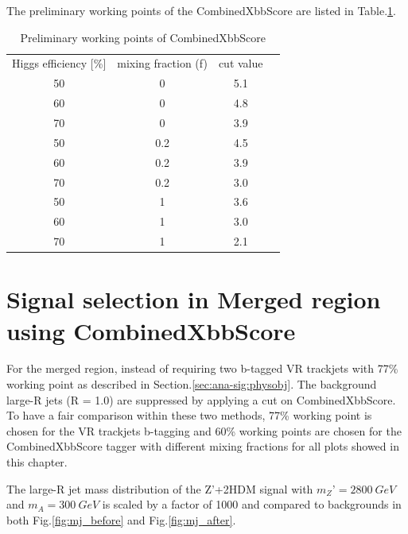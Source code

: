 \par The preliminary working points of the CombinedXbbScore are listed in Table.\ref{tab:combxbb}.

\begin{table}
    \footnotesize{
        \begin{center}
            \begin{tabular}{ c |c |c |c}
                \hline
                \hline
                Higgs efficiency [\%] & mixing fraction (f)	& cut value \\
                50 & 0 & 5.1 \\
                60 & 0 & 4.8 \\
                70 & 0 & 3.9 \\
                50 & 0.2 & 4.5 \\
                60 & 0.2 & 3.9 \\
                70 & 0.2 & 3.0 \\
                50 & 1 & 3.6 \\
                60 & 1 & 3.0 \\
                70 & 1 & 2.1 \\
                \hline
                \hline
            \end{tabular}
        \end{center}
        }
    \caption{Preliminary working points of CombinedXbbScore}
    \label{tab:combxbb}
\end{table}

\section{Signal selection in Merged region using CombinedXbbScore}

\par For the merged region, instead of requiring two b-tagged VR trackjets with 77\% working point as described in Section.\ref{sec:ana-sig:physobj}. 
The background large-R jets (R = 1.0) are suppressed by applying a cut on CombinedXbbScore. 
To have a fair comparison within these two methods, 77\% working point is chosen for the VR trackjets b-tagging and 60\% working points are chosen for the CombinedXbbScore tagger with different mixing fractions for all plots showed in this chapter.					

\par The large-R jet mass distribution of the Z’+2HDM signal with $m_Z’ = 2800~GeV$ and $m_A = 300~GeV$ is scaled by a factor of 1000 and compared to backgrounds in both Fig.\ref{fig:mj_before} and Fig.\ref{fig:mj_after}. 	

